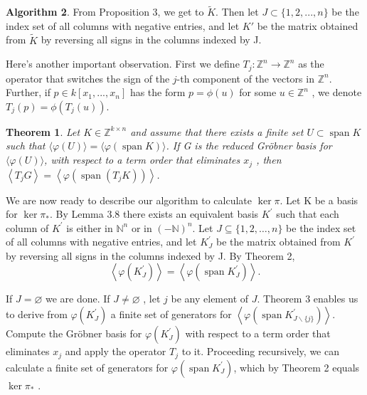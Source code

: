 \documentclass{article}
\theoremstyle{plain}
\newtheorem{theorem}{Theorem}[section]
\theoremstyle{definition}
\newtheorem{algorithm}[theorem]{Algorithm}
\begin{document}
\begin{algorithm}
From Proposition 3, we get to $\tilde{K}$. Then let $J \subset \{1, 2, ..., n\}$ be the index set of all columns with negative entries, and let $K'$ be the matrix obtained from $\tilde{K}$ by reversing all signs in the columns indexed by J. 

Here's another important observation. First we define $T_j:\mathbb{Z}^n \to \mathbb{Z}^n $ as the operator that switches the sign of the $j$-th component of the vectors in $\mathbb{Z}^n$. Further, if $p \in k[x_1,...,x_n]$ has the form $p = \phi(u)$ for some $u\in\mathbb{Z}^n$ , we denote $T_j (p) = \phi(T_j(u))$. 

\begin{theorem}Let  $K \in \mathbb{Z}^{k \times n}$  and assume that there exists a finite set  $U \subset \operatorname{span} K$  such that  $\langle\varphi(U)\rangle=\langle\varphi(\operatorname{span} K)\rangle$. If G  is the reduced Gröbner basis for  $\langle\varphi(U)\rangle$, with respect to a term order that eliminates  $x_{j}$ , then $ \left\langle T_{j} G\right\rangle=\left\langle\varphi\left(\operatorname{span}\left(T_{j} K\right)\right)\right\rangle$. \end{theorem}

We are now ready to describe our algorithm to calculate  $\operatorname{ker} \pi$. Let K be a basis for $\operatorname{ker}  \pi_{*}$. By Lemma  3.8  there exists an equivalent basis  $K^{\prime}$  such that each column of  $K^{\prime}$  is either in  $\mathbb{N}^{n}$  or in  $(-\mathbb{N})^{n}$. Let  $J \subseteq\{1,2, \ldots, n\}$  be the index set of all columns with negative entries, and let  $K_{J}^{\prime}$  be the matrix obtained from  $K^{\prime}$  by reversing all signs in the columns indexed by J. By Theorem 2, 
$$\left\langle\varphi\left(K_{J}^{\prime}\right)\right\rangle=\left\langle\varphi\left(\operatorname{span} K_{J}^{\prime}\right)\right\rangle .$$

If  $J=\varnothing$  we are done. If  $J \neq \varnothing$ , let  $j$  be any element of  $J$. Theorem 3 enables us to derive from  $\varphi\left(K_{J}^{\prime}\right)$  a finite set of generators for  $\left\langle\varphi\left(\operatorname{span} K_{J \backslash\{j\}}^{\prime}\right)\right\rangle$. Compute the Gröbner basis for  $\varphi\left(K_{J}^{\prime}\right)$  with respect to a term order that eliminates  $x_{j}$  and apply the operator  $T_{j}$  to it. Proceeding recursively, we can calculate a finite set of generators for  $\varphi\left(\operatorname{span} K_{J}^{\prime}\right)$, which by Theorem 2 equals $\operatorname{ker} \pi_*$ .


\end{algorithm}
\end{document}
